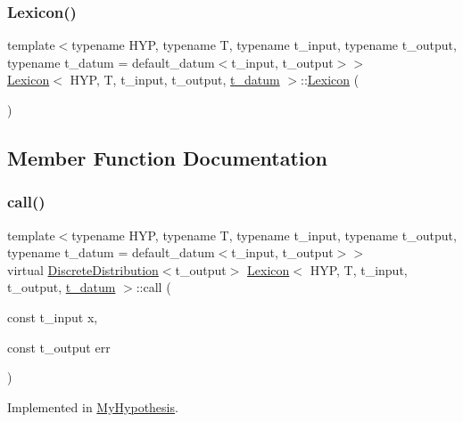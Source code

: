 \subsubsection{\texorpdfstring{Lexicon()}{Lexicon()}\hspace{0.1cm}{\footnotesize\ttfamily [2/2]}}
{\footnotesize\ttfamily template$<$typename H\+YP, typename T, typename t\+\_\+input, typename t\+\_\+output, typename t\+\_\+datum = default\+\_\+datum$<$t\+\_\+input, t\+\_\+output$>$$>$ \\
\hyperlink{class_lexicon}{Lexicon}$<$ H\+YP, T, t\+\_\+input, t\+\_\+output, \hyperlink{class_bayesable_a7c93a2eeab708378eb321745908718d4}{t\+\_\+datum} $>$\+::\hyperlink{class_lexicon}{Lexicon} (\begin{DoxyParamCaption}{ }\end{DoxyParamCaption})\hspace{0.3cm}{\ttfamily [inline]}}



\subsection{Member Function Documentation}
\mbox{\label{class_lexicon_aaaff682145f9cb15f7252420fe76f111}} 
\subsubsection{\texorpdfstring{call()}{call()}}
{\footnotesize\ttfamily template$<$typename H\+YP, typename T, typename t\+\_\+input, typename t\+\_\+output, typename t\+\_\+datum = default\+\_\+datum$<$t\+\_\+input, t\+\_\+output$>$$>$ \\
virtual \hyperlink{class_discrete_distribution}{Discrete\+Distribution}$<$t\+\_\+output$>$ \hyperlink{class_lexicon}{Lexicon}$<$ H\+YP, T, t\+\_\+input, t\+\_\+output, \hyperlink{class_bayesable_a7c93a2eeab708378eb321745908718d4}{t\+\_\+datum} $>$\+::call (\begin{DoxyParamCaption}\item[{const t\+\_\+input}]{x,  }\item[{const t\+\_\+output}]{err }\end{DoxyParamCaption})\hspace{0.3cm}{\ttfamily [pure virtual]}}



Implemented in \hyperlink{class_my_hypothesis_a016146970c06041b3133f60152a80a24}{My\+Hypothesis}.

